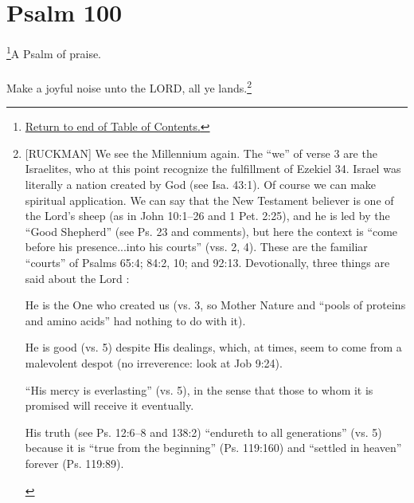 \chapter{Psalm 100}
\footnote{\textcolor[rgb]{0.00,0.25,0.00}{\hyperlink{TOC}{Return to end of Table of Contents.}}}\textcolor[rgb]{0.00,0.00,1.00}{A Psalm of praise.}\\
\\
\textcolor[rgb]{0.00,0.00,1.00}{Make a joyful noise unto the LORD, all ye lands.}\footnote{[RUCKMAN] We see the Millennium again. The “we” of
verse 3 are the Israelites, who at this point recognize the fulfillment of Ezekiel 34. Israel was literally a nation created by God (see Isa. 43:1). Of course we can make spiritual application. We can say that the New Testament believer is one of the Lord’s sheep (as in John 10:1–26 and 1 Pet. 2:25), and he is led by the “Good Shepherd” (see Ps. 23 and comments), but here the context is “come before his presence...into his courts” (vss. 2, 4). These are the familiar “courts” of Psalms 65:4; 84:2, 10; and 92:13.
Devotionally, three things are said about the Lord  \cite{Ruckman1992Psalms} : \begin{compactenum}
\item He is the One who created us (vs. 3, so
Mother Nature and “pools of proteins and
amino acids” had nothing to do with it).
\item He is good (vs. 5) despite His dealings,
which, at times, seem to come from a
malevolent despot (no irreverence: look at Job
9:24).
\item “His mercy is everlasting” (vs. 5), in the
sense that those to whom it is promised will
receive it eventually.
\item His truth (see Ps. 12:6–8 and 138:2)
“endureth to all generations” (vs. 5)
because it is “true from the beginning” (Ps.
119:160) and “settled in heaven” forever
(Ps. 119:89).
\end{compactenum}}

